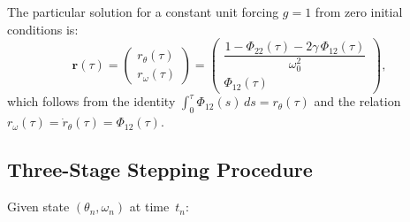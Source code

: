 \documentclass[11pt,a4paper]{article}
\newcommand{\br}{\mathbf{r}}
\begin{document}
The particular solution for a constant unit forcing $g = 1$ from zero initial
conditions is:
\begin{equation}\label{eq:den-response}
  \br(\tau) =
  \begin{pmatrix}
    r_\theta(\tau) \\ r_\omega(\tau)
  \end{pmatrix}
  =
  \begin{pmatrix}
    \dfrac{1 - \Phi_{22}(\tau) - 2\gamma\,\Phi_{12}(\tau)}{\omega_0^2} \\[8pt]
    \Phi_{12}(\tau)
  \end{pmatrix},
\end{equation}
which follows from the identity
$\int_0^\tau \Phi_{12}(s)\,ds = r_\theta(\tau)$ and the relation
$r_\omega(\tau) = \dot{r}_\theta(\tau) = \Phi_{12}(\tau)$.

\subsection{Three-Stage Stepping Procedure}

Given state $(\theta_n,\omega_n)$ at time~$t_n$:
\end{document}
